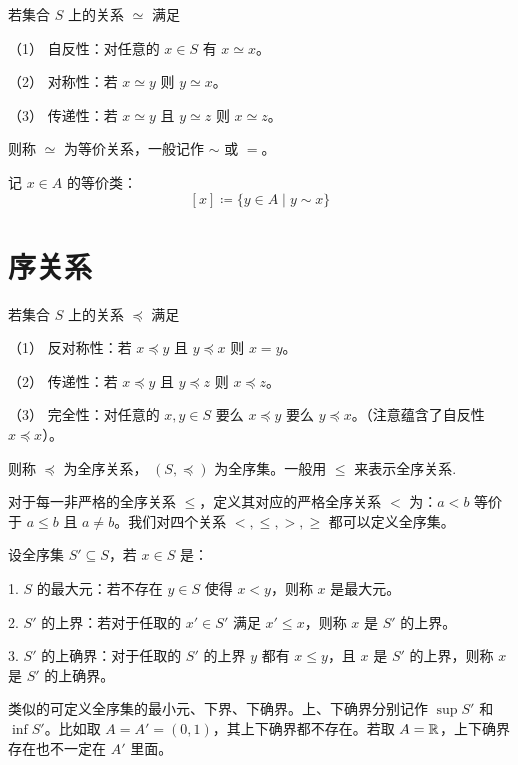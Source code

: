 \begin{definition}[等价关系]
	若集合 $S$ 上的关系 $\simeq$ 满足

	（1） 自反性：对任意的 $x\in S$ 有 $x \simeq x$。

	（2） 对称性：若 $x \simeq y$ 则 $y \simeq x$。

	（3） 传递性：若 $x \simeq y$ 且 $y \simeq z$ 则 $x \simeq z$。

	则称 $\simeq$ 为等价关系，一般记作 $\sim$ 或 $=$。
\end{definition}

记 $x\in A$ 的等价类：
$$[x] \coloneqq  \{y \in A \mid y \sim x\}$$

\section{序关系}

\begin{definition}[全序关系]
	若集合 $S$ 上的关系 $\preceq$ 满足

	（1） 反对称性：若 $x \preceq y$ 且 $y \preceq x$ 则 $x = y$。

	（2） 传递性：若 $x \preceq y$ 且 $y \preceq z$ 则 $x \preceq z$。

	（3） 完全性：对任意的 $x,y\in S$ 要么 $x \preceq y$ 要么 $y \preceq x$。（注意蕴含了自反性 $x \preceq x$）。

	则称 $\preceq$ 为全序关系， $(S,\preceq)$ 为全序集。一般用 $\leqslant$ 来表示全序关系.
\end{definition}

对于每一非严格的全序关系 $\leqslant$，定义其对应的严格全序关系 $<$ 为：$a < b$ 等价于 $a \leqslant b$ 且 $a \neq b$。我们对四个关系 $<, \leqslant, >, \geqslant$ 都可以定义全序集。

\begin{definition}
	设全序集 $S' \subseteq S$，若 $x \in S$ 是：

	1. $S$ 的最大元：若不存在 $y \in S$ 使得 $x < y$，则称 $x$ 是最大元。

	2. $S'$ 的上界：若对于任取的 $x' \in S'$ 满足 $x' \leqslant x$，则称 $x$ 是 $S'$ 的上界。

	3. $S'$ 的上确界：对于任取的 $S'$ 的上界 $y$ 都有 $x \leqslant y$，且 $x$ 是 $S'$ 的上界，则称 $x$ 是 $S'$ 的上确界。
\end{definition}

类似的可定义全序集的最小元、下界、下确界。上、下确界分别记作 $\sup S'$ 和 $\inf S'$。比如取 $A = A' = (0, 1)$，其上下确界都不存在。若取 $A = \mathbb{R}$，上下确界存在也不一定在 $A'$ 里面。

